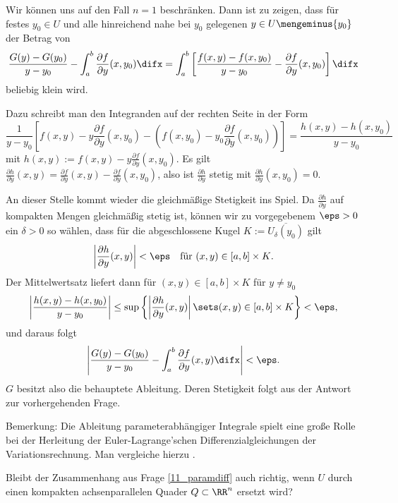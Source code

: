 \begin{antwort}
  Wir können uns auf den Fall $n=1$ beschränken. 
  Dann ist zu zeigen, dass für festes 
  $y_0 \in U$ und alle hinreichend nahe bei $y_0$ 
  gelegenen $y\in U \mengeminus{y_0}$ der Betrag von 
  \[
  \frac{G(y)-G(y_0)}{y-y_0} - 
  \int_a^b \frac{\partial f}{\partial y} (x,y_0) \difx =
  \int_a^b \left[ \frac{f(x,y)-f(x,y_0)}{y-y_0} - 
    \frac{\partial f}{\partial y} (x,y_0) \right] \difx 
  \]
  beliebig klein wird. 

  Dazu schreibt man den Integranden auf der rechten Seite in der Form 
  \[
  \frac{1}{y-y_0} \left[ f(x,y)-y
    \frac{\partial f}{\partial y} (x,y_0) - \left( 
      f(x,y_0)- y_0 \frac{\partial f}{\partial y} (x,y_0) \right) \right]
  = \frac{ h(x,y)-h(x,y_0) }{y-y_0}
  \]
  mit $ h(x,y):= f(x,y)-y \frac{\partial f}{\partial y} (x,y_0)$. 
  Es gilt $
  \frac{\partial h}{\partial y} (x,y)=
  \frac{\partial f}{\partial y} (x,y) -
  \frac{\partial f}{\partial y} (x,y_0)$, 
  also ist $\frac{\partial h}{\partial y}$ stetig mit 
  $\frac{\partial h}{\partial y} (x,y_0)=0$. 

  An dieser Stelle kommt wieder die gleichmäßige Stetigkeit ins Spiel. 
  Da $\frac{\partial h}{\partial y}$ auf kompakten Mengen gleichmäßig 
  stetig ist, können wir zu vorgegebenem $\eps>0$ ein $\delta>0$ so wählen, 
  dass für die abgeschlossene Kugel $K := \overline{U_\delta (y_0)}$ 
  gilt 
  \[
  \left| \frac{\partial h}{\partial y} (x,y) \right| < \eps 
  \quad\text{für $(x,y) \in [a,b]\times K$}. 
  \]
  Der Mittelwertsatz liefert dann für $(x,y) \in [a,b]\times K$ 
  für $y\not=y_0$ 
  \[
  \left| \frac{h(x,y)-h(x,y_0)}{y-y_0} \right| 
  \le \sup \left\{ \left| \frac{\partial h}{\partial y} (x,y) \right| \sets
    (x,y) \in [a,b]\times K \right\}
  < \eps,
  \]
  und daraus folgt
  \[
  \left| \frac{G(y)-G(y_0)}{y-y_0} - \int_a^b 
    \frac{\partial f}{\partial y} (x,y) \difx \right| < \eps.
  \]
  $G$ besitzt also die behauptete Ableitung. Deren Stetigkeit 
  folgt aus der Antwort zur vorhergehenden Frage.

  Bemerkung: Die Ableitung parameterabhängiger 
  Integrale spielt eine große Rolle bei der Herleitung der 
  Euler-Lagrange'schen Differenzialgleichungen der Variationsrechnung.
  Man vergleiche hierzu \citep{Koenig}.
  \AntEnd
\end{antwort} 

\begin{frage}
  Bleibt der Zusammenhang aus Frage \ref{11_paramdiff} auch richtig, wenn 
  $U$ durch einen kompakten achsenparallelen Quader $Q\subset\RR^n$ ersetzt 
  wird?
\end{frage}

